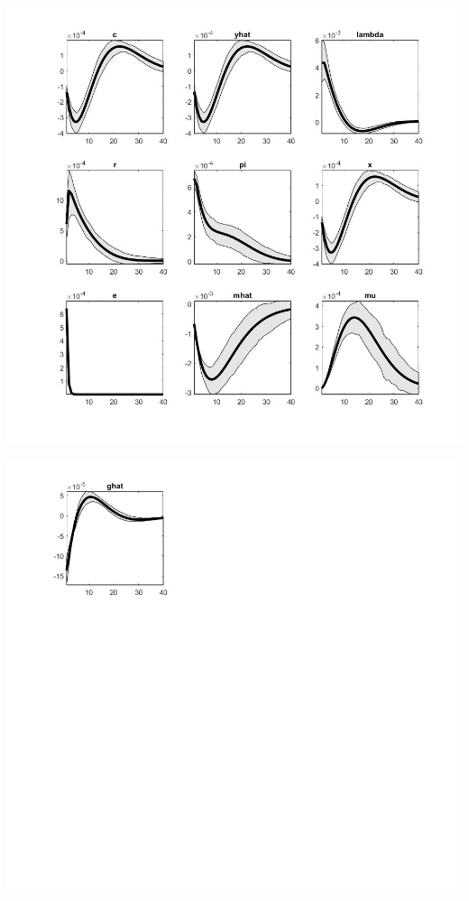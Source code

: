 \documentclass[11pt,preprint, authoryear]{elsarticle}
\let\origfigure\figure
\let\endorigfigure\endfigure
\renewenvironment{figure}[1][2] {
    \expandafter\origfigure\expandafter[H]
} {
    \endorigfigure
}
\numberwithin{equation}{section}
\numberwithin{figure}{section}
\numberwithin{table}{section}
\begin{document}
\begin{figure}
    \centering 
    \begin{minipage}[t]{8.2cm} 
        \centering 
        \includegraphics[width=\linewidth]{flex_e1.jpg} 
    \end{minipage} 
    \hspace{0.1cm} 
    \begin{minipage}[t]{8.2cm} 
        \centering 
        \includegraphics[width=\linewidth]{flex_e2.jpg} 
    \end{minipage}
    \caption{Orthogonalized Shock to Cost Push Shock - Flexible Money Growth Rule}
    \label{flex_e}
\end{figure}
\end{document}
